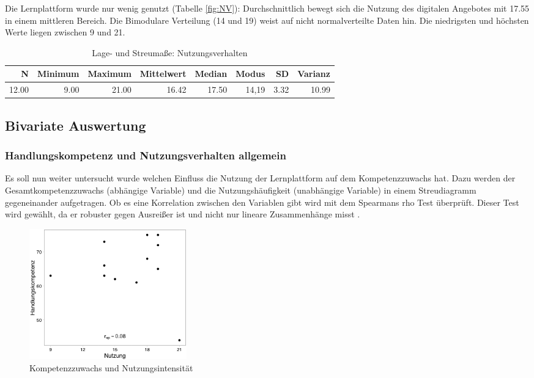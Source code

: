 \documentclass[12pt,smallheadings, bibliography=totoc]{scrartcl}
\begin{document}
Die Lernplattform wurde nur wenig genutzt (Tabelle \ref{fig:NV}):
Durchschnittlich bewegt sich die Nutzung des digitalen Angebotes mit
17.55 in einem mittleren Bereich. Die Bimodulare Verteilung (14 und 19)
weist auf nicht normalverteilte Daten hin. Die niedrigsten und höchsten
Werte liegen zwischen 9 und 21.

\begin{table}[H]
\centering
\caption{Lage- und Streumaße: Nutzungsverhalten}
\label{tab:NV}
\begin{tabular}{rrrrrrrr}
  \hline
  N & Minimum & Maximum & Mittelwert & Median & Modus & SD & Varianz \\
  \hline
 12.00 & 9.00 & 21.00 & 16.42 & 17.50 & 14,19 & 3.32 & 10.99 \\     
   \hline
\end{tabular}
\end{table}

\subsection{Bivariate Auswertung}\label{bivariate-auswertung}

\subsubsection{Handlungskompetenz und Nutzungsverhalten
allgemein}\label{handlungskompetenz-und-nutzungsverhalten-allgemein}

Es soll nun weiter untersucht wurde welchen Einfluss die Nutzung der
Lernplattform auf dem Kompetenzzuwachs hat. Dazu werden der
Gesamtkompetenzzuwachs (abhängige Variable) und die Nutzungshäufigkeit
(unabhängige Variable) in einem Streudiagramm gegeneinander aufgetragen.
Ob es eine Korrelation zwischen den Variablen gibt wird mit dem
Spearmans rho Test überprüft. Dieser Test wird gewählt, da er robuster
gegen Ausreißer ist und nicht nur lineare Zusammenhänge misst
\parencite{Kuckartz2013} .

\begin{figure}[H]
\centering
\includegraphics[width=0.33\textwidth]{Anhang/spearneu.png}
\caption{Kompetenzzuwachs und Nutzungsintensität}
\label{fig:spear}
\end{figure}
\end{document}
